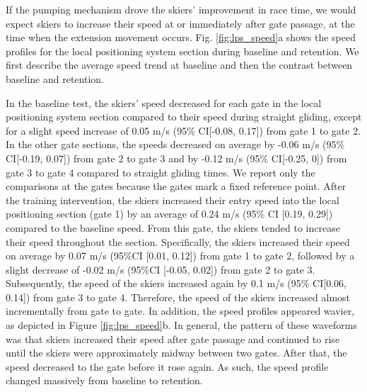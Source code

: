If the pumping mechanism drove the skiers' improvement in race time, we would expect skiers to increase their speed at or immediately after gate passage, at the time when the extension movement occurs. Fig. \ref{fig:lps_speed}a shows the speed profiles for the local positioning system section during baseline and retention. We first describe the average speed trend at baseline and then the contrast between baseline and retention.

In the baseline test, the skiers’ speed decreased for each gate in the local positioning system section compared to their speed during straight gliding, except for a slight speed increase of 0.05 m/s (95\% CI[-0.08, 0.17]) from gate 1 to gate 2. In the other gate sections, the speeds decreased on average by -0.06 m/s (95\% CI[-0.19, 0.07]) from gate 2 to gate 3 and by -0.12 m/s (95\% CI[-0.25, 0]) from gate 3 to gate 4 compared to straight gliding times. We report only the comparisons at the gates because the gates mark a fixed reference point. After the training intervention, the skiers increased their entry speed into the local positioning section (gate 1) by an average of 0.24 m/s (95\% CI [0.19, 0.29]) compared to the baseline speed. From this gate, the skiers tended to increase their speed throughout the section. Specifically, the skiers increased their speed on average by 0.07 m/s (95\%CI [0.01, 0.12]) from gate 1 to gate 2, followed by a slight decrease of -0.02 m/s (95\%CI [-0.05, 0.02]) from gate 2 to gate 3. Subsequently, the speed of the skiers increased again by 0.1 m/s (95\% CI[0.06, 0.14]) from gate 3 to gate 4. Therefore, the speed of the skiers increased almost incrementally from gate to gate. In addition, the speed profiles appeared wavier, as depicted in Figure \ref{fig:lps_speed}b. In general, the pattern of these waveforms was that skiers increased their speed after gate passage and continued to rise until the skiers were approximately midway between two gates. After that, the speed decreased to the gate before it rose again. As such, the speed profile changed massively from baseline to retention. 

